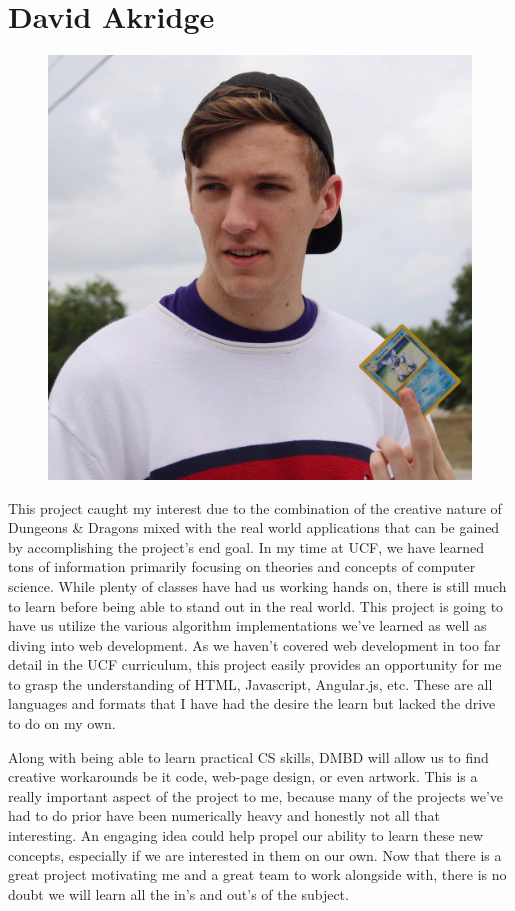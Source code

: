 \documentclass[12pt,a4paper]{report}
\begin{document}
	\newpage
	\section{David Akridge}
	\begin{figure}
		\includegraphics[scale=0.05]{David_Akridge}
	\end{figure}
	This project caught my interest due to the combination of the creative nature of Dungeons \& Dragons mixed with the real world applications that can be gained by accomplishing the project’s end goal. In my time at UCF, we have learned tons of information primarily focusing on theories and concepts of computer science. While plenty of classes have had us working hands on, there is still much to learn before being able to stand out in the real world. This project is going to have us utilize the various algorithm implementations we’ve learned as well as diving into web development. As we haven’t covered web development in too far detail in the UCF curriculum, this project easily provides an opportunity for me to grasp the understanding of HTML, Javascript, Angular.js, etc. These are all languages and formats that I have had the desire the learn but lacked the drive to do on my own. \par
	Along with being able to learn practical CS skills, DMBD will allow us to find creative workarounds be it code, web-page design, or even artwork. This is a really important aspect of the project to me, because many of the projects we’ve had to do prior have been numerically heavy and honestly not all that interesting. An engaging idea could help propel our ability to learn these new concepts, especially if we are interested in them on our own. Now that there is a great project motivating me and a great team to work alongside with, there is no doubt we will learn all the in’s and out’s of the subject. 
	
\end{document}
